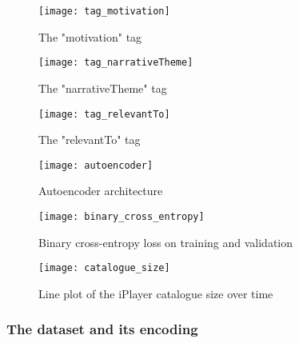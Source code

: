 \begin{figure}[h]
  \centering
  \texttt{[image: tag\_motivation]}
  \caption{The "motivation" tag}
  \label{fig:tag_motivation}
\end{figure}

\begin{figure}[h]
  \centering
  \texttt{[image: tag\_narrativeTheme]}
  \caption{The "narrativeTheme" tag}
  \label{fig:tag_narrativeTheme}
\end{figure}

\begin{figure}[h]
  \centering
  \texttt{[image: tag\_relevantTo]}
  \caption{The "relevantTo" tag}
  \label{fig:tag_relevantTo}
\end{figure}

\begin{figure}[h]
  \centering
  \texttt{[image: autoencoder]}
  \caption{Autoencoder architecture}
  \label{fig:autoencoder}
\end{figure}

\begin{figure}[h]
  \centering
  \texttt{[image: binary\_cross\_entropy]}
  \caption{Binary cross-entropy loss on training and validation}
  \label{fig:binary_cross_entropy}
\end{figure}

\begin{figure}[h]
  \centering
  \texttt{[image: catalogue\_size]}
  \caption{Line plot of the iPlayer catalogue size over time}
  \label{fig:catalogue_size}
\end{figure}

\subsubsection{The dataset and its encoding}




